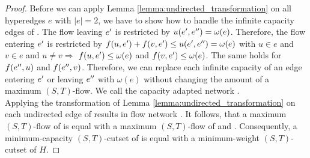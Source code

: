 \begin{proof}

Before we can apply Lemma \ref{lemma:undirected_transformation} on all hyperedges $e$
with $|e| = 2$, we have to show how to handle the infinite capacity edges of .
The flow leaving $e'$ is restricted by $u(e',e'') = \omega(e)$. Therefore, the flow entering
$e'$ is restricted by $f(u,e') + f(v,e') \le u(e',e'') = \omega(e)$ with $u \in e$ and
$v \in e$ and $u \neq v \Rightarrow$ $f(u,e') \le \omega(e)$ and $f(v,e') \le \omega(e)$.
The same holds for $f(e'',u)$ and $f(e'',v)$. Therefore, we can replace each infinite 
capacity of an edge entering $e'$ or leaving $e''$ with $\omega(e)$ without changing the amount
of a maximum $(S,T)$-flow. We call the capacity adapted network .\\
Applying the transformation of Lemma \ref{lemma:undirected_transformation} on each undirected
edge of  results in flow network . It follows, that a maximum $(S,T)$-flow of  is equal
with a maximum $(S,T)$-flow of  and . Consequently, a minimum-capacity
$(S,T)$-cutset of  is equal with a minimum-weight $(S,T)$-cutset of $H$.


\end{proof}

